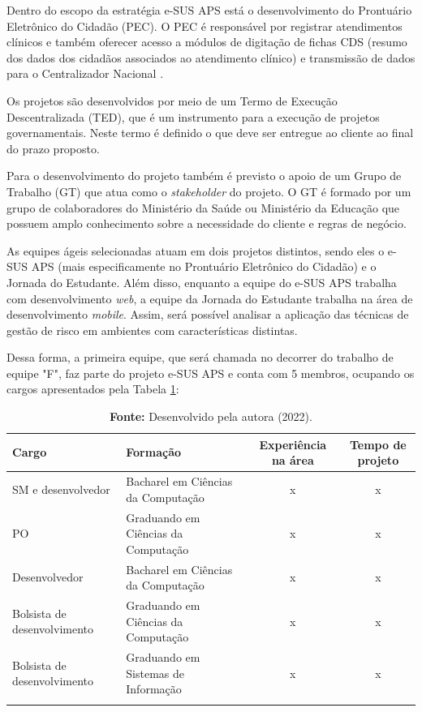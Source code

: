 \documentclass[
    12pt,       %
    openright,      %
    twoside,      %
    a4paper,      %
    english,      %
    french,       %
    spanish,      %
    brazil,       %
    ]{abntex2}
\begin{document}
Dentro do escopo da estratégia e-SUS APS está o desenvolvimento do Prontuário Eletrônico do Cidadão (PEC). O PEC é responsável por registrar atendimentos clínicos e também oferecer acesso a módulos de digitação de fichas CDS (resumo dos dados dos cidadãos associados ao atendimento clínico) e transmissão de dados para o Centralizador Nacional \cite{Bridge:2022}.

Os projetos são desenvolvidos por meio de um Termo de Execução Descentralizada (TED), que é um instrumento para a execução de projetos governamentais. Neste termo é definido o que deve ser entregue ao cliente ao final do prazo proposto. 

Para o desenvolvimento do projeto também é previsto o apoio de um Grupo de Trabalho (GT) que atua como o \textit{stakeholder} do projeto. O GT é formado por um grupo de colaboradores do Ministério da Saúde ou Ministério da Educação que possuem amplo conhecimento sobre a necessidade do cliente e regras de negócio.

As equipes ágeis selecionadas atuam em dois projetos distintos, sendo eles o e-SUS APS (mais especificamente no Prontuário Eletrônico do Cidadão) e o Jornada do Estudante. Além disso, enquanto a equipe do e-SUS APS trabalha com desenvolvimento \textit{web}, a equipe da Jornada do Estudante trabalha na área de desenvolvimento \textit{mobile}. Assim, será possível analisar a aplicação das técnicas de gestão de risco em ambientes com características distintas.

Dessa forma, a primeira equipe, que será chamada no decorrer do trabalho de equipe "F", faz parte do projeto e-SUS APS e conta com 5 membros, ocupando os cargos apresentados pela Tabela \ref{tab:EquipeF}:

\begin{longtable}{|p{4cm}|p{4cm}|c|c|}
    \caption{Membros da equipe F}
    \label{tab:EquipeF}
    \centering
            \centering
            \hline \rowcolor{lightgray}
            \textbf{Cargo} & \textbf{Formação} & \textbf{Experiência na área} & \textbf{Tempo de projeto} 
            \\ \hline 
            SM e desenvolvedor & Bacharel em Ciências da Computação & x & x 
            \\ \hline
            PO & Graduando em Ciências da Computação & x & x 
            \\ \hline 
            Desenvolvedor & Bacharel em Ciências da Computação & x & x 
            \\ \hline 
            Bolsista de desenvolvimento & Graduando em Ciências da Computação & x & x 
            \\ \hline 
            Bolsista de desenvolvimento & Graduando em Sistemas de Informação & x & x 
            \\ \hline 
            \addlinespace[0.2cm]
            \caption*{\textbf{Fonte:} Desenvolvido pela autora (2022).}
\end{longtable}
\end{document}
